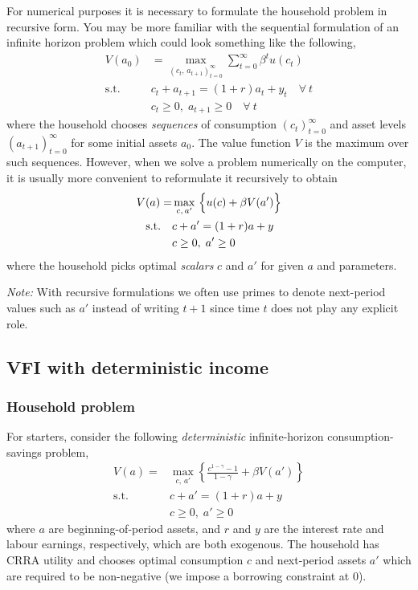 \documentclass{scrartcl}
\begin{document}
    For numerical purposes it is necessary to formulate the household
problem in recursive form. You may be more familiar with the sequential
formulation of an infinite horizon problem which could look something
like the following, \[
\begin{aligned}
V(a_0) &= \max_{(c_t,\,a_{t+1})_{t=0}^{\infty}}
\sum_{t=0}^{\infty} \beta^t u(c_t)  \\
\text{s.t.} \quad & c_t + a_{t+1} = (1+r)a_t + y_t \quad \forall~t \\
& c_t \geq 0,\; a_{t+1} \geq 0 \quad \forall~t
\end{aligned}
\] where the household chooses \emph{sequences} of consumption
\((c_t)_{t=0}^{\infty}\) and asset levels \((a_{t+1})_{t=0}^{\infty}\)
for some initial assets \(a_0\). The value function \(V\) is the maximum
over such sequences. However, when we solve a problem numerically on the
computer, it is usually more convenient to reformulate it recursively to
obtain \[
\begin{aligned}
V(a) = &\max_{c,\,a'}~\Bigl\{ u(c)
    + \beta V(a') \Bigr\} \\
    \text{s.t.} \quad &c + a' = (1+r)a  + y \\
    & c \geq 0,\; a' \geq 0
\end{aligned}
\] where the household picks optimal \emph{scalars} \(c\) and \(a'\) for
given \(a\) and parameters.

\emph{Note:} With recursive formulations we often use primes to denote
next-period values such as \(a'\) instead of writing \(t+1\) since time
\(t\) does not play any explicit role.


\hypertarget{vfi-with-deterministic-income}{%
\subsection{VFI with deterministic
income}\label{vfi-with-deterministic-income}}

    \hypertarget{household-problem}{%
\subsubsection{Household problem}\label{household-problem}}

For starters, consider the following \emph{deterministic}
infinite-horizon consumption-savings problem, \[
\begin{aligned}
V(a) = &\max_{c,\,a'} \left\{ 
    \frac{c^{1-\gamma} - 1}{1-\gamma}
    + \beta V(a') \right\} \\
    \text{s.t.} \quad &c + a' = (1+r)a  + y \\
    &c \geq 0,\; a' \geq 0
\end{aligned}
\] where \(a\) are beginning-of-period assets, and \(r\) and \(y\) are
the interest rate and labour earnings, respectively, which are both
exogenous. The household has CRRA utility and chooses optimal
consumption \(c\) and next-period assets \(a'\) which are required to be
non-negative (\ie we impose a borrowing constraint at 0).
\end{document}
